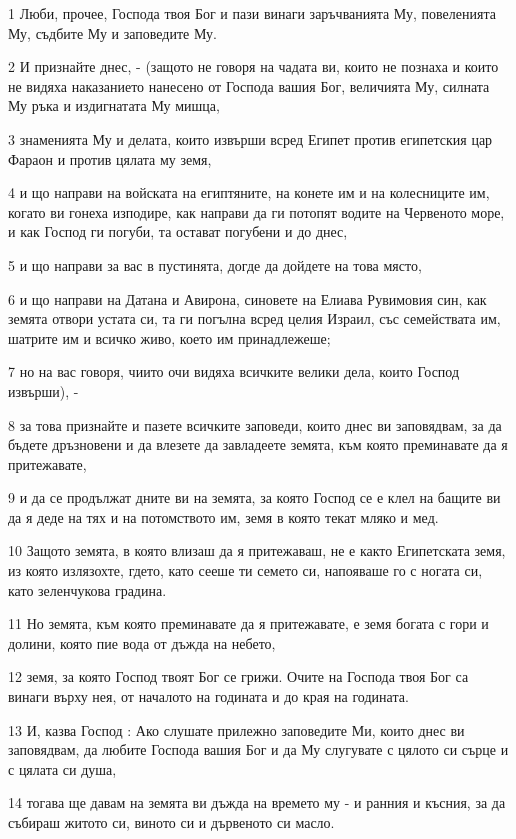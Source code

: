 \par 1 Люби, прочее, Господа твоя Бог и пази винаги заръчванията Му, повеленията Му, съдбите Му и заповедите Му.
\par 2 И признайте днес, - (защото не говоря на чадата ви, които не познаха и които не видяха наказанието нанесено от Господа вашия Бог, величията Му, силната Му ръка и издигнатата Му мишца,
\par 3 знаменията Му и делата, които извърши всред Египет против египетския цар Фараон и против цялата му земя,
\par 4 и що направи на войската на египтяните, на конете им и на колесниците им, когато ви гонеха изподире, как направи да ги потопят водите на Червеното море, и как Господ ги погуби, та остават погубени и до днес,
\par 5 и що направи за вас в пустинята, догде да дойдете на това място,
\par 6 и що направи на Датана и Авирона, синовете на Елиава Рувимовия син, как земята отвори устата си, та ги погълна всред целия Израил, със семействата им, шатрите им и всичко живо, което им принадлежеше;
\par 7 но на вас говоря, чиито очи видяха всичките велики дела, които Господ извърши), -
\par 8 за това признайте и пазете всичките заповеди, които днес ви заповядвам, за да бъдете дръзновени и да влезете да завладеете земята, към която преминавате да я притежавате,
\par 9 и да се продължат дните ви на земята, за която Господ се е клел на бащите ви да я деде на тях и на потомството им, земя в която текат мляко и мед.
\par 10 Защото земята, в която влизаш да я притежаваш, не е както Египетската земя, из която излязохте, гдето, като сееше ти семето си, напояваше го с ногата си, като зеленчукова градина.
\par 11 Но земята, към която преминавате да я притежавате, е земя богата с гори и долини, която пие вода от дъжда на небето,
\par 12 земя, за която Господ твоят Бог се грижи. Очите на Господа твоя Бог са винаги върху нея, от началото на годината и до края на годината.
\par 13 И, казва Господ : Ако слушате прилежно заповедите Ми, които днес ви заповядвам, да любите Господа вашия Бог и да Му слугувате с цялото си сърце и с цялата си душа,
\par 14 тогава ще давам на земята ви дъжда на времето му - и ранния и късния, за да събираш житото си, виното си и дървеното си масло.
